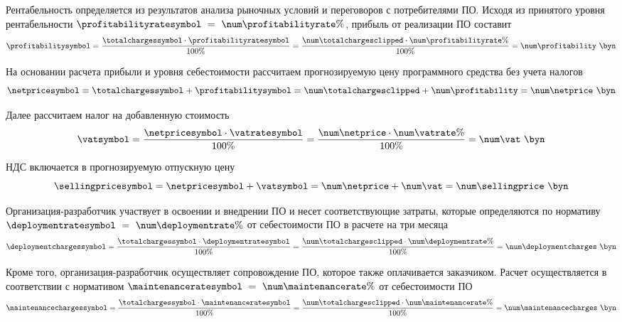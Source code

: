 Рентабельность определяется из результатов анализа рыночных условий и переговоров с потребителями ПО. Исходя из принятого уровня рентабельности $\profitabilityratesymbol~=~\profitabilityratevalue$, прибыль от реализации ПО составит
\begin{equation}
	\profitabilitysymbol = \frac{\totalchargessymbol \cdot \profitabilityratesymbol}{100\%} = \frac{\totalchargesvalue \cdot \profitabilityratevalue}{100\%} = \profitabilityvalue~\byn
\end{equation}

На основании расчета прибыли и уровня себестоимости рассчитаем прогнозируемую цену программного средства без учета налогов
\begin{equation}
	\netpricesymbol = \totalchargessymbol + \profitabilitysymbol = \totalchargesvalue + \profitabilityvalue = \netpricevalue~\byn
\end{equation}

Далее рассчитаем налог на добавленную стоимость
\begin{equation}
	\vatsymbol = \frac{\netpricesymbol \cdot \vatratesymbol}{100\%} = \frac{\netpricevalue \cdot \vatratevalue}{100\%} = \vatvalue~\byn
\end{equation}

НДС включается в прогнозируемую отпускную цену
\begin{equation}
	\sellingpricesymbol = \netpricesymbol + \vatsymbol = \netpricevalue + \vatvalue = \sellingpricevalue~\byn
\end{equation}

Организация-разработчик участвует в освоении и внедрении ПО и несет соответствующие затраты, которые определяются по нормативу $\deploymentratesymbol~=~\deploymentratevalue$ от себестоимости ПО в расчете на три месяца
\begin{equation}
	\deploymentchargessymbol = \frac{\totalchargessymbol \cdot \deploymentratesymbol}{100\%} = \frac{\totalchargesvalue \cdot \deploymentratevalue}{100\%} = \deploymentchargesvalue~\byn
\end{equation}

Кроме того, организация-разработчик осуществляет сопровождение ПО, которое также оплачивается заказчиком. Расчет осуществляется в соответствии с нормативом $\maintenanceratesymbol~=~\maintenanceratevalue$ от себестоимости ПО
\begin{equation}
	\maintenancechargessymbol = \frac{\totalchargessymbol \cdot \maintenanceratesymbol}{100\%} = \frac{\totalchargesvalue \cdot \maintenanceratevalue}{100\%} = \maintenancechargesvalue~\byn
\end{equation}

